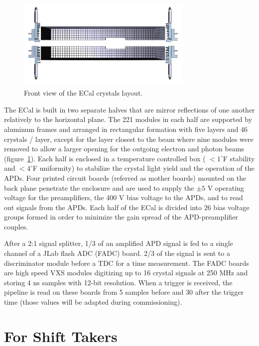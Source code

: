 \documentclass[12pt]{article}
\begin{document}
\begin{figure}
\center
\includegraphics[width=0.75\textwidth]{ECal2.png}
\caption{\small \label{Crystals} Front view of the ECal crystals layout.}
\end{figure}
      
The ECal is built in two separate halves that are mirror reflections of one another relatively to the horizontal plane. The 221 modules in each half are supported by aluminum frames and arranged in rectangular formation with five layers and 46 crystals / layer, except for the layer closest to the beam where nine modules were removed to allow a larger opening for the outgoing electron and photon beams (figure~\ref{Crystals}). Each half is enclosed in a temperature controlled box ( $< 1^\circ$F stability and $< 4^\circ$F uniformity) to stabilize the crystal light yield and the operation of the APDs. Four printed circuit boards (referred as mother boards) mounted on the back plane penetrate the enclosure and are used to supply the $\pm5$ V operating voltage for the preamplifiers, the 400 V bias voltage to the APDs, and to read out signals from the APDs. Each half of the ECal is divided into 26 bias voltage groups formed in order to minimize the gain spread of the APD-preamplifier couples.


After a 2:1 signal splitter, 1/3 of an amplified APD signal is fed to a single channel of a JLab flash ADC (FADC) board. 2/3 of the signal is sent to a discriminator module before a TDC for a time measurement. The FADC boards are high speed VXS modules digitizing up to 16 crystal signals at 250 MHz and storing 4 ns samples with 12-bit resolution. When a trigger is received, the pipeline is read on these boards from 5 samples before and 30 after the trigger time (those values will be adapted during commissioning).



\part{For Shift Takers}
\end{document}
